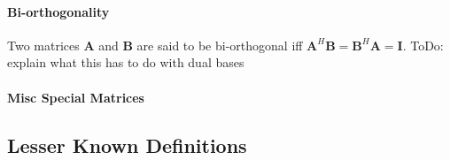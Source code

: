 
\paragraph{Bi-orthogonality}
Two matrices $\mathbf{A}$ and $\mathbf{B}$ are said to be bi-orthogonal iff $\mathbf{A}^H \mathbf{B} =  \mathbf{B}^H \mathbf{A} = \mathbf{I}$. ToDo: explain what this has to do with dual bases




\paragraph{Misc Special Matrices}












\subsection{Lesser Known Definitions}

